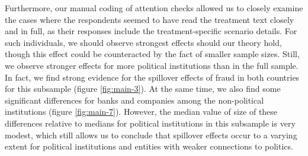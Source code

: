 \documentclass[11pt, ngerman,english,a4]{article}
\begin{document}
Furthermore, our manual coding of attention checks allowed us to closely examine the cases where the respondents seemed to have read the treatment text closely and in full, as their responses include the treatment-specific scenario details. For such individuals, we should observe strongest effects should our theory hold, though this effect could be counteracted by the fact of smaller sample sizes. Still, we observe stronger effects for more political institutions than in the full sample. In fact, we find strong evidence for the spillover effects of fraud in both countries for this subsample (figure \ref{fig:main-3}). At the same time, we also find some significant differences for banks and companies among the non-political institutions (figure \ref{fig:main-7}). However, the median value of size of these differences relative to medians for political institutions in this subsample is very modest, which still allows us to conclude that spillover effects occur to a varying extent for political institutions and entities with weaker connections to politics. 
\end{document}
